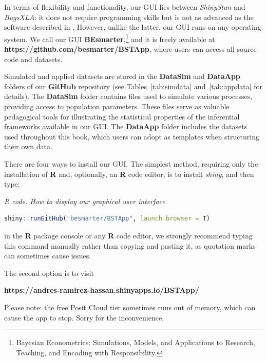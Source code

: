 In terms of flexibility and functionality, our GUI lies between \textit{ShinyStan} and \textit{BugsXLA}: it does not require programming skills but is not as advanced as the software described in \cite{Karabatsos2016}. However, unlike the latter, our GUI runs on any operating system. We call our GUI \textbf{BEsmarter},\footnote{Bayesian Econometrics: Simulations, Models, and Applications to Research, Teaching, and Encoding with Responsibility.} and it is freely available at \textbf{\textbf{https://github.com/besmarter/BSTApp}}, where users can access all source code and datasets.

Simulated and applied datasets are stored in the \textbf{DataSim} and \textbf{DataApp} folders of our \textbf{GitHub} repository (see Tables~\ref{tab:simdata} and~\ref{tab:appdata} for details). The \textbf{DataSim} folder contains files used to simulate various processes, providing access to population parameters. These files serve as valuable pedagogical tools for illustrating the statistical properties of the inferential frameworks available in our GUI. The \textbf{DataApp} folder includes the datasets used throughout this book, which users can adopt as templates when structuring their own data.

There are four ways to install our GUI. The simplest method, requiring only the installation of \textbf{R} and, optionally, an \textbf{R} code editor, is to install \textit{shiny}, and then type:

\begin{tcolorbox}[enhanced,width=4.67in,center upper,
	fontupper=\large\bfseries,drop shadow southwest,sharp corners]
	\textit{R code. How to display our graphical user interface}
	\begin{VF}
		\begin{lstlisting}[language=R]
shiny::runGitHub("besmarter/BSTApp", launch.browser = T)\end{lstlisting}
	\end{VF}
\end{tcolorbox} 

in the \textbf{R} package console or any \textbf{R} code editor, we strongly recommend typing this command manually rather than copying and pasting it, as quotation marks can sometimes cause issues.

The second option is to visit

\textbf{https://andres-ramirez-hassan.shinyapps.io/BSTApp/}

Please note: the free Posit Cloud tier sometimes runs out of memory, which can cause the app to stop. Sorry for the inconvenience.

